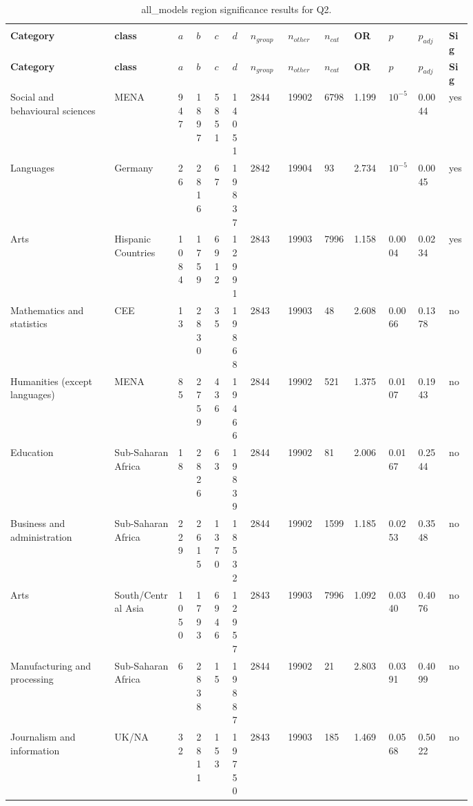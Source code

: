 \begin{longtable}{p{0.18\linewidth}p{0.11\linewidth}p{0.035\linewidth}p{0.035\linewidth}p{0.035\linewidth}p{0.035\linewidth}p{0.045\linewidth}p{0.045\linewidth}p{0.045\linewidth}p{0.06\linewidth}p{0.055\linewidth}p{0.055\linewidth}p{0.04\linewidth}}
\caption{all_models region significance results for Q2.}\\
\label{tab:appendix-q2-all_models-region}\\
\scriptsize
\setlength{\tabcolsep}{2pt}
\toprule
\textbf{Category} & \textbf{class} & \textbf{$a$} & \textbf{$b$} & \textbf{$c$} & \textbf{$d$} & \textbf{$n_{group}$} & \textbf{$n_{other}$} & \textbf{$n_{cat}$} & \textbf{OR} & \textbf{$p$} & \textbf{$p_{adj}$} & \textbf{Sig} \\
\midrule
\endfirsthead
\toprule
\textbf{Category} & \textbf{class} & \textbf{$a$} & \textbf{$b$} & \textbf{$c$} & \textbf{$d$} & \textbf{$n_{group}$} & \textbf{$n_{other}$} & \textbf{$n_{cat}$} & \textbf{OR} & \textbf{$p$} & \textbf{$p_{adj}$} & \textbf{Sig} \\
\midrule
\endhead
\midrule
\endfoot
\bottomrule
\endlastfoot
Social and behavioural sciences & MENA & 947 & 1897 & 5851 & 14051 & 2844 & 19902 & 6798 & 1.199 & $10^{-5}$ & 0.0044 & yes \\
Languages & Germany & 26 & 2816 & 67 & 19837 & 2842 & 19904 & 93 & 2.734 & $10^{-5}$ & 0.0045 & yes \\
Arts & Hispanic Countries & 1084 & 1759 & 6912 & 12991 & 2843 & 19903 & 7996 & 1.158 & 0.0004 & 0.0234 & yes \\
Mathematics and statistics & CEE & 13 & 2830 & 35 & 19868 & 2843 & 19903 & 48 & 2.608 & 0.0066 & 0.1378 & no \\
Humanities (except languages) & MENA & 85 & 2759 & 436 & 19466 & 2844 & 19902 & 521 & 1.375 & 0.0107 & 0.1943 & no \\
Education & Sub-Saharan Africa & 18 & 2826 & 63 & 19839 & 2844 & 19902 & 81 & 2.006 & 0.0167 & 0.2544 & no \\
Business and administration & Sub-Saharan Africa & 229 & 2615 & 1370 & 18532 & 2844 & 19902 & 1599 & 1.185 & 0.0253 & 0.3548 & no \\
Arts & South/Central Asia & 1050 & 1793 & 6946 & 12957 & 2843 & 19903 & 7996 & 1.092 & 0.0340 & 0.4076 & no \\
Manufacturing and processing & Sub-Saharan Africa & 6 & 2838 & 15 & 19887 & 2844 & 19902 & 21 & 2.803 & 0.0391 & 0.4099 & no \\
Journalism and information & UK/NA & 32 & 2811 & 153 & 19750 & 2843 & 19903 & 185 & 1.469 & 0.0568 & 0.5022 & no \\

\end{longtable}
